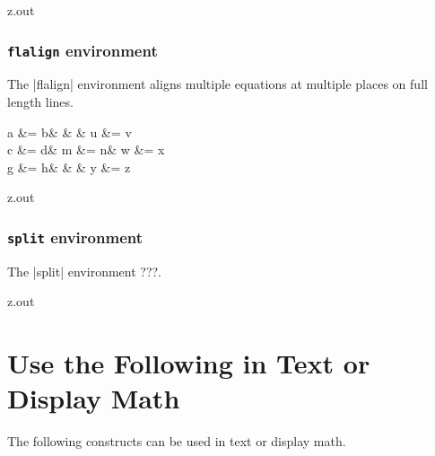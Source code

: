 \begin{VerbatimOut}{z.out}

\index{\verb+\begin{flalign}+}
\subsubsection{\texttt{flalign} environment}

The
|flalign|
environment aligns multiple equations at multiple places
on full length lines.

\begin{flalign}
  a &= b&   &   & u &= v\\
  c &= d& m &= n& w &= x\notag\\
  g &= h&   &   & y &= z
\end{flalign}
\end{VerbatimOut}

\MyIO


\begin{VerbatimOut}{z.out}

\index{\verb+\begin{split}+}
\subsubsection{\texttt{split} environment}

The
|split|
environment ???.
\index{\verb+\begin{split}+}


\end{VerbatimOut}

\MyIO


\begin{VerbatimOut}{z.out}


\newpage
\section{Use the Following in Text or Display Math}

The following constructs can be used in text or display math.
\end{VerbatimOut}

\MyIO


